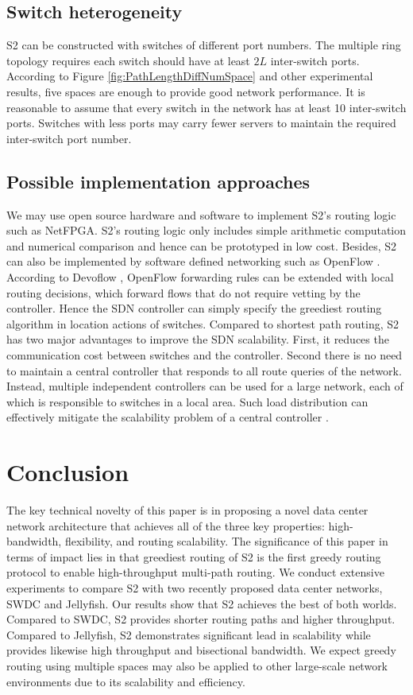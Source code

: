 \documentclass[10pt,conference]{IEEEtran}
\begin{document}
\subsection{Switch heterogeneity} \label{sec:heterogeneity}
S2 can be constructed with switches of different port numbers.
The multiple ring topology requires each switch should have at least $2L$ inter-switch ports.
According to Figure \ref{fig:PathLengthDiffNumSpace} and other experimental results, five spaces are enough to provide good network performance.
It is reasonable to assume that every switch in the network has at least 10 inter-switch ports.
Switches with less ports may carry fewer servers to maintain the required inter-switch port number.


\subsection{Possible implementation approaches}
We may use open source hardware and software to implement  S2's routing logic such as NetFPGA. S2's routing logic only includes simple arithmetic computation and numerical comparison and hence can be prototyped in low cost. Besides, S2 can also be implemented by software defined networking such as OpenFlow \cite{OpenFlow}.
According to Devoflow \cite{DevoFlow}, OpenFlow forwarding rules can be extended with local routing decisions, which forward flows that do not require vetting by the controller.  Hence the SDN controller can simply specify the greediest routing algorithm in location actions of switches.
Compared to shortest path routing, S2 has two major advantages to improve the SDN scalability.
First, it reduces the communication cost between switches and the controller. Second there is no need to maintain a central controller that responds to all route queries of the network. Instead, multiple independent controllers can be used for a large network, each of which is responsible to switches in a local area. Such load distribution can  effectively mitigate the scalability problem of a central controller \cite{IMC09} \cite{Benson10}.

\section{Conclusion}
\label{sec:conclusion}

The key technical novelty of this paper is in proposing a novel data center network architecture that achieves all of the three key properties: high-bandwidth, flexibility, and routing scalability. The significance of this paper in terms of impact lies in that greediest routing of S2 is the first greedy routing protocol to enable high-throughput multi-path routing.  We conduct extensive experiments to compare S2 with two recently proposed data center networks, SWDC and Jellyfish. Our results show that S2 achieves the best of both worlds. Compared to SWDC, S2 provides shorter routing paths and higher throughput.  Compared to Jellyfish, S2 demonstrates significant lead in scalability while provides likewise high throughput and bisectional bandwidth. We expect greedy routing using multiple spaces may also be applied to other large-scale network environments due to its scalability and efficiency.
\end{document}
